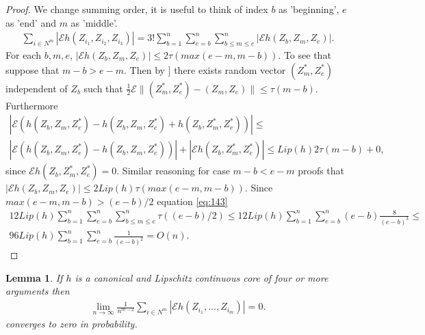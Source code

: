 \documentclass{article} %
\newtheorem{lemma}{Lemma}
\newcommand{\ev}{\mathcal{E}}
\begin{document}
\begin{proof}
We change summing order, it is useful to think of index $b$ as 'beginning', $e$ as 'end' and $m$ as 'middle'. 
 \begin{align}
 \label{eq:143}
 \sum_{i \in N^{m}} |\ev   h(Z_{i_1},Z_{i_2},Z_{i_3})| =  3! \sum_{b=1}^n \sum_{e=b}^n \sum_{b \leq m \leq e }^n |\ev   h(Z_b,Z_m,Z_e)|.
\end{align}
For each $b,m,e$, $|\ev   h(Z_b,Z_m,Z_e)| \leq 2 \tau(max(e-m,m-b))$. To see that suppose that $m-b>e-m$. Then by \cite[Equation 2.1]{leucht_dependent_2013}] there exists random vector $(Z_m^*,Z_e^*)$ independent of $Z_b$ such that $\frac 1 2 \ev \parallel (Z_m^*,Z_e^*) - (Z_m,Z_e) \parallel \leq \tau(m-b)$. Furthermore 
\begin{align}
 |\ev   \left(   h(Z_b,Z_m,Z_e^*) -  h(Z_b,Z_m,Z_e^*) + h(Z_b,Z_m^*,Z_e^*) \right) | \leq  \\
 |\ev   \left(   h(Z_b,Z_m,Z_e^*) -  h(Z_b,Z_m,Z_e^*) \right) |+ |\ev h(Z_b,Z_m^*,Z_e^*) | \leq Lip(h) 2\tau(m-b) +0, 
\end{align}
since $\ev h(Z_b,Z_m^*,Z_e^*)=0$. Similar reasoning for case $m-b<e-m$ proofs that $|\ev   h(Z_b,Z_m,Z_e)| \leq 2 Lip(h) \tau(max(e-m,m-b))$. Since $max(e-m,m-b)>(e-b)/2$   equation \eqref{eq:143} 
\begin{align}
12 Lip(h) \sum_{b=1}^n \sum_{e=b}^n \sum_{b \leq m \leq e }^n \tau((e-b)/2) \leq 12 Lip(h) \sum_{b=1}^n \sum_{e=b}^n (e-b) \frac{8} {(e-b)^3} \leq \\
96 Lip(h) \sum_{b=1}^n \sum_{e=b}^n \frac{1} {(e-b)^2} = O(n).
\end{align}
\end{proof}


\begin{lemma}
\label{lem:missingBit}
 If $h$ is a canonical and Lipschitz continuous core of four or more arguments then
\begin{align}
 \lim_{n \to \infty} \frac{1}{n^{m-2}} \sum_{i \in N^{m}} |\ev   h(Z_{i_1},...,Z_{i_m})| =0.
\end{align}
converges to zero in probability.
\end{lemma}
\end{document}
